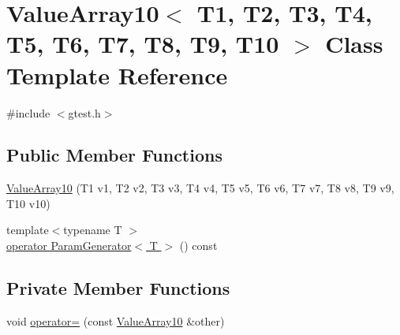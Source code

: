 \hypertarget{classtesting_1_1internal_1_1ValueArray10}{\section{\-Value\-Array10$<$ \-T1, \-T2, \-T3, \-T4, \-T5, \-T6, \-T7, \-T8, \-T9, \-T10 $>$ \-Class \-Template \-Reference}
\label{d6/d31/classtesting_1_1internal_1_1ValueArray10}
}


{\ttfamily \#include $<$gtest.\-h$>$}

\subsection*{\-Public \-Member \-Functions}
\begin{DoxyCompactItemize}
\item 
\hyperlink{classtesting_1_1internal_1_1ValueArray10_af98d02239c1d178bf0588221069d9251}{\-Value\-Array10} (\-T1 v1, \-T2 v2, \-T3 v3, \-T4 v4, \-T5 v5, \-T6 v6, \-T7 v7, \-T8 v8, \-T9 v9, \-T10 v10)
\item 
{\footnotesize template$<$typename T $>$ }\\\hyperlink{classtesting_1_1internal_1_1ValueArray10_a08ef46fa12c9dd8ef6fc630baeea89b7}{operator Param\-Generator$<$ T $>$} () const 
\end{DoxyCompactItemize}
\subsection*{\-Private \-Member \-Functions}
\begin{DoxyCompactItemize}
\item 
void \hyperlink{classtesting_1_1internal_1_1ValueArray10_a2af6a2a89108ff59d7e518e277253023}{operator=} (const \hyperlink{classtesting_1_1internal_1_1ValueArray10}{\-Value\-Array10} \&other)
\end{DoxyCompactItemize}
